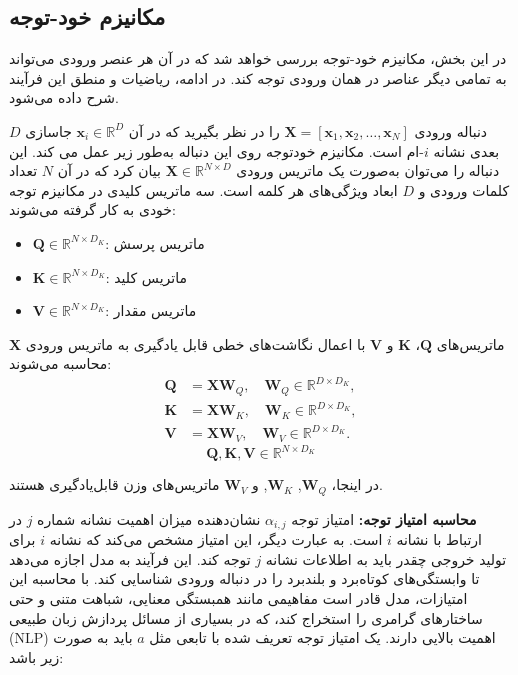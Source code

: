   \subsection{مکانیزم خود-توجه\protect{}}

در این بخش، مکانیزم خود-توجه بررسی خواهد شد که در آن هر عنصر ورودی می‌تواند به تمامی دیگر عناصر در همان ورودی توجه  کند. در ادامه، ریاضیات و منطق این فرآیند شرح داده می‌شود.

دنباله ورودی
$\mathbf{X} = [\mathbf{x}_1, \mathbf{x}_2, \dots, \mathbf{x}_N]$
را در نظر بگیرید که در آن 
$\mathbf{x}_i \in \mathbb{R}^D$
جاسازی
$D$
بعدی نشانه  $i$-ام است. مکانیزم خودتوجه روی این دنباله به‌طور زیر عمل می کند. این دنباله را می‌توان به‌صورت یک ماتریس ورودی $\mathbf{X} \in \mathbb{R}^{N \times D}$ بیان کرد که در آن $N$ تعداد کلمات ورودی و $D$ ابعاد ویژگی‌های هر کلمه است. سه ماتریس کلیدی در مکانیزم توجه خودی به کار گرفته می‌شوند:
\begin{itemize}
	\item $\mathbf{Q} \in \mathbb{R}^{N \times D_K}$: ماتریس پرسش 
	\item $\mathbf{K} \in \mathbb{R}^{N \times D_K}$: ماتریس کلید 
	\item $\mathbf{V} \in \mathbb{R}^{N \times D_K}$: ماتریس مقدار 
\end{itemize}

ماتریس‌های $\mathbf{Q}$، $\mathbf{K}$ و $\mathbf{V}$ با اعمال نگاشت‌های خطی قابل یادگیری به ماتریس ورودی $\mathbf{X}$ محاسبه می‌شوند:
\begin{align*}
	\mathbf{Q} &= \mathbf{X} \mathbf{W}_Q, \quad \mathbf{W}_Q \in \mathbb{R}^{D \times D_K}, \\
	\mathbf{K} &= \mathbf{X} \mathbf{W}_K, \quad \mathbf{W}_K \in \mathbb{R}^{D \times D_K}, \\
	\mathbf{V} &= \mathbf{X} \mathbf{W}_V, \quad \mathbf{W}_V \in \mathbb{R}^{D \times D_K}.
\end{align*}
$$
	\mathbf{Q}, \mathbf{K}, \mathbf{V} \in \mathbb{R}^{N\times D_K}
$$


در اینجا، $\mathbf{W}_Q$, $\mathbf{W}_K$, و $\mathbf{W}_V$ ماتریس‌های وزن قابل‌یادگیری هستند.

\textbf{محاسبه امتیاز توجه:} 
امتیاز توجه $\alpha_{i,j}$ نشان‌دهنده میزان اهمیت  نشانه%
شماره $j$ در ارتباط با نشانه $i$ است. به عبارت دیگر، این امتیاز مشخص می‌کند که نشانه $i$ برای تولید خروجی چقدر باید به اطلاعات نشانه $j$ توجه کند. این فرآیند به مدل اجازه می‌دهد تا وابستگی‌های کوتاه‌برد و بلند‌برد را در دنباله ورودی شناسایی کند. با محاسبه این امتیازات، مدل قادر است مفاهیمی مانند همبستگی معنایی، شباهت متنی و حتی ساختارهای گرامری را استخراج کند، که در بسیاری از مسائل پردازش زبان طبیعی (NLP) اهمیت بالایی دارند. یک امتیاز توجه تعریف شده با تابعی مثل $a$ باید به صورت زیر باشد:

